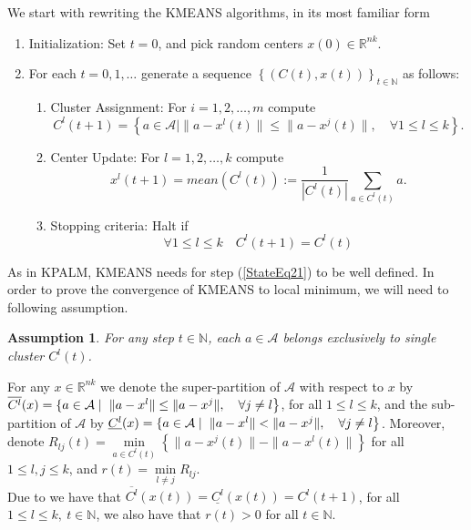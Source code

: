 \documentclass[11pt]{article}
\numberwithin{equation}{section}
\newtheorem{assumption}{Assumption}
\begin{document}
We start with rewriting the KMEANS algorithms, in its most familiar form
\begin{enumerate}[(1)]
	\item Initialization: Set $t=0$, and pick random centers $x(0) \in \mathbb{R}^{nk}$.

	\item For each $t=0,1, \ldots$ generate a sequence $\left\lbrace (C(t),x(t))\right\rbrace_{t \in \mathbb{N}}$ as follows:
	\begin{enumerate}[(2.1)]
		\item Cluster Assignment: For $i=1, 2, \ldots ,m$ compute
		\begin{equation}
			C^l(t+1) = \left\lbrace a \in \mathcal{A} \mid \| a - x^l(t) \| \leq \|a - x^j(t) \|, \quad \forall 1 \leq l \leq k \right\rbrace . \label{StateEq20}
		\end{equation}
		
		\item Center Update: For $l=1, 2, \ldots ,k$ compute
		\begin{equation}
			x^l(t+1) = mean(C^l(t)) := \frac{1}{\left| C^l(t) \right|} \sum\limits_{a \in C^l(t)} a . \label{StateEq21}
		\end{equation}
		
		\item Stopping criteria: Halt if 
		\begin{equation}
			\forall 1 \leq l \leq k \quad C^l(t+1)=C^l(t) \label{StateEq22}
		\end{equation}
	\end{enumerate}
\end{enumerate}
As in KPALM, KMEANS needs  for step (\ref{StateEq21}) to be well defined. In order to prove the convergence of KMEANS to local minimum, we will need to following assumption.

\begin{assumption} \label{StateEq23}
For any step $t \in \mathbb{N}$, each $a \in \mathcal{A}$ belongs exclusively to single cluster $C^l(t)$.
\end{assumption}

For any $x \in \mathbb{R}^{nk}$ we denote the super-partition of $\mathcal{A}$ with respect to $x$ by $\overline{C^l}(x) = \left\lbrace a \in \mathcal{A} \mid \right. \\ \left. \|a - x^l\| \leq \|a - x^j\| , \quad \forall j \neq l \right\rbrace$, for all $1 \leq l \leq k$, and the sub-partition of $\mathcal{A}$ by $\underline{C^l}(x) = \left\lbrace a \in \mathcal{A} \mid \right. \\ \left. \|a - x^l\| < \|a - x^j\|, \quad \forall j \neq l \right\rbrace$.
Moreover, denote $R_{lj}(t) = \min\limits_{a \in C^l(t)} \left\lbrace \|a - x^j(t)\| - \|a - x^l(t)\| \right\rbrace$ for all $1 \leq l,j \leq k$, and $r(t) = \min\limits_{l \neq j} R_{lj}$. \\
Due to  we have that $\overline{C^l}(x(t)) = \underline{C^l}(x(t)) = C^l(t+1)$, for all $1 \leq l \leq k, \: t \in \mathbb{N}$, we also have that $r(t) > 0$ for all $t \in \mathbb{N}$.
\end{document}
